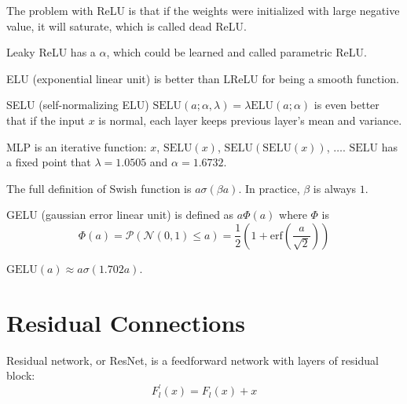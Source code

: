 \begin{example}[Relu]
    The problem with ReLU is that if the weights were initialized with large negative value, it will saturate, which is called dead ReLU.    
\end{example}

\begin{example}[LReLU]
    Leaky ReLU has a $\alpha$, which could be learned and called parametric ReLU.    
\end{example}

\begin{example}[ELU]
    ELU (exponential linear unit) is better than LReLU for being a smooth function.    
\end{example}


\begin{definition}[SELU]
    SELU (self-normalizing ELU) $\text{SELU}(a;\alpha,\lambda) = \lambda \text{ELU}(a;\alpha)$ is even better that if the input $x$ is normal, each layer keeps previous layer's mean and variance.     
    
    MLP is an iterative function: $x$, $\text{SELU}(x)$, $\text{SELU}(\text{SELU}(x))$, $\dots$. $\text{SELU}$ has a fixed point that $\lambda = 1.0505$ and $\alpha = 1.6732$. 

\end{definition}


\begin{example}[Swish]
    The full definition of Swish function is $a\sigma(\beta a)$. In practice, $\beta$ is always $1$. 
\end{example}

\begin{example}[GELU]
    GELU (gaussian error linear unit) is defined as $a \Phi(a)$ where $\Phi$ is
    \begin{equation}
        \Phi(a) = \mathcal{P}(\mathcal{N}(0,1) \leq a) = \frac{1}{2}\left(1+\text{erf}\left(\frac{a}{\sqrt{2}}\right)\right)
    \end{equation}
    
    $\text{GELU}(a) \approx a \sigma(1.702 a)$. 
\end{example}


\section{Residual Connections}

Residual network, or ResNet, is a feedforward network with layers of residual block:
\begin{equation}
    F_l^{'} (x) = F_l (x) + x
\end{equation}

